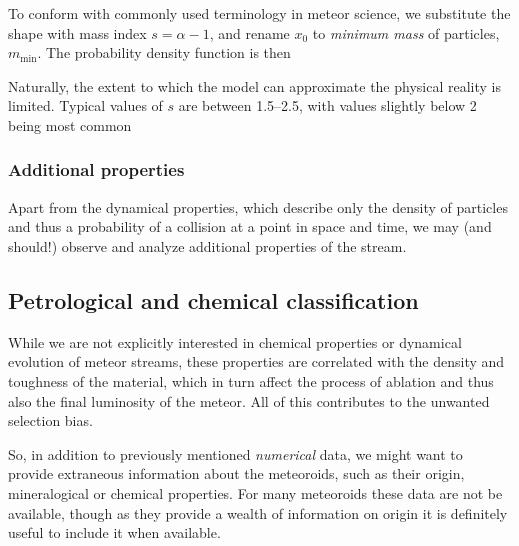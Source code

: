             To conform with commonly used terminology in meteor science, we substitute the shape with mass index
            $s = \alpha - 1$, and rename $x_0$ to \emph{minimum mass} of particles, $m_\mathrm{min}$.
            The probability density function is then

            Naturally, the extent to which the model can approximate the physical reality is limited.
            Typical values of $s$ are between \numrange{1.5}{2.5}, with values slightly below 2 being most common \cite{...}

        \subsubsection{Additional properties} \label{mpa}
            Apart from the dynamical properties, which describe only the density of particles
            and thus a probability of a collision at a point in space and time,
            we may (and should!) observe and analyze additional properties of the stream.

            \subsection{Petrological and chemical classification} \label{mpac}
                While we are not explicitly interested in chemical properties
                or dynamical evolution of meteor streams, these properties
                are correlated with the density and toughness of the material,
                which in turn affect the process of ablation
                and thus also the final luminosity of the meteor.
                All of this contributes to the unwanted selection bias.

                So, in addition to previously mentioned \textit{numerical} data, we might want to
                provide extraneous information about the meteoroids, such as their origin,
                mineralogical or chemical properties.
                For many meteoroids these data are not be available,
                though as they provide a wealth of information on origin
                it is definitely useful to include it when available.


